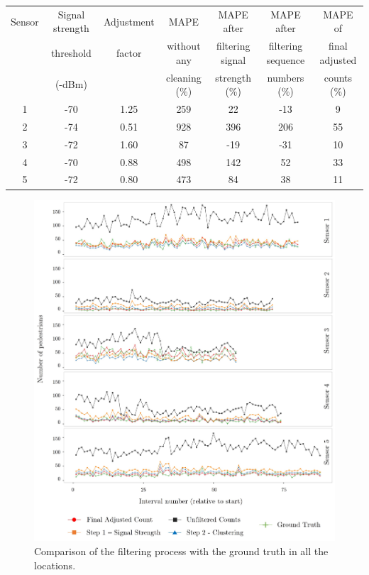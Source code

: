 \begin{table}
	{\begin{tabular}{ccccccc} 
		\toprule
			Sensor & Signal strength & Adjustment & MAPE & MAPE after & MAPE after & MAPE of\\
			& threshold & factor & without any & filtering signal & filtering sequence & final adjusted\\
			& (-dBm) & &  cleaning (\%) & strength (\%) & numbers (\%) & counts (\%)\\
		 \midrule
			1 & -70 & 1.25 & 259 &  22 & -13 &  9 \\
			2 & -74 & 0.51 & 928 & 396 & 206 & 55 \\
			3 & -72 & 1.60 &  87 & -19 & -31 & 10 \\
			4 & -70 & 0.88 & 498 & 142 &  52 & 33 \\
			5 & -72 & 0.80 & 473 &  84 &  38 & 11 \\
		 \bottomrule
	\end{tabular}}
	\label{errors-table}
\end{table}

\begin{figure}
	\begin{center}
		\includegraphics [width=\linewidth,trim=6 6 6 6,clip] {images/main_comparison.jpeg}
		\caption{Comparison of the filtering process with the ground truth in all the locations.}
		\label{main_comparison}
	\end{center}
\end{figure}

